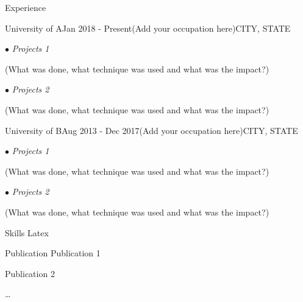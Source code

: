 \documentclass{resume} %
\begin{document}
\begin{rSection}{Experience}

\begin{rSubsection}{University of A}{Jan 2018 - Present}{(Add your occupation here)}{CITY, STATE}
\item[$\bullet$] \textit{Projects 1}
\item (What was done, what technique was used and what was the impact?)

\item[$\bullet$] \textit{Projects 2}
\item (What was done, what technique was used and what was the impact?)
\end{rSubsection}

\begin{rSubsection}{University of B}{Aug 2013 - Dec 2017}{(Add your occupation here)}{CITY, STATE}

\item[$\bullet$] \textit{Projects 1}
\item (What was done, what technique was used and what was the impact?)

\item[$\bullet$] \textit{Projects 2}
\item (What was done, what technique was used and what was the impact?)
\end{rSubsection}

\end{rSection}


\begin{rSection}{Skills}
Latex
\end{rSection}

\begin{rSection}{Publication}
Publication 1

Publication 2

\dots
\end{rSection}
\end{document}
